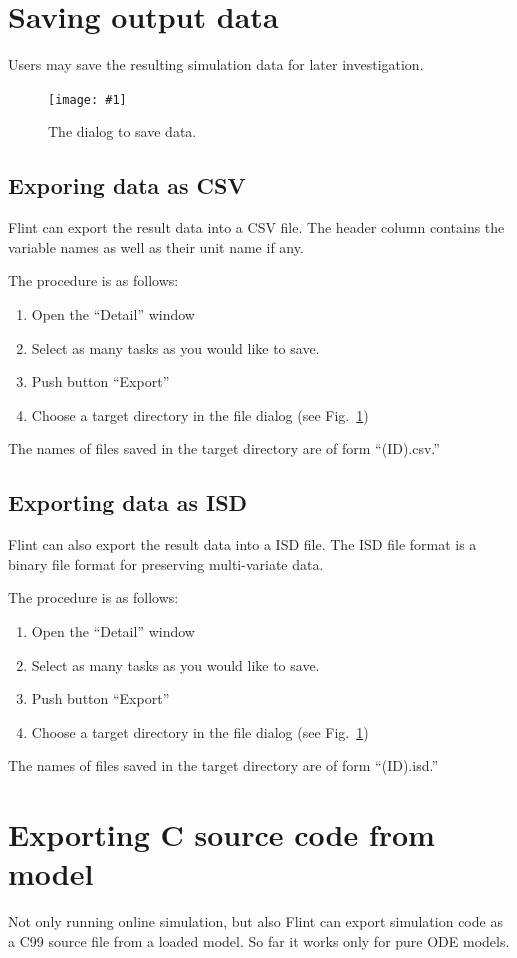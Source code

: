 \documentclass[a4paper,10pt]{report}
\newcommand\FigureOfImage[2]{\begin{figure}[h]
  \centering
  \texttt{[image: \#1]}
  \caption{#2}\label{fig:#1}
\end{figure}}
\begin{document}
\section{Saving output data}
Users may save the resulting simulation data for later investigation.
\FigureOfImage{lr-export}{The dialog to save data.}

\subsection{Exporing data as CSV}
Flint can export the result data into a CSV file.
The header column contains the variable names as well as their unit name if any.

The procedure is as follows:
\begin{enumerate}
\item Open the ``Detail'' window
\item Select as many tasks as you would like to save.
\item Push button ``Export''
\item Choose a target directory in the file dialog (see Fig.~\ref{fig:lr-export})
\end{enumerate}
The names of files saved in the target directory are of form ``(ID).csv.''

\subsection{Exporting data as ISD}
Flint can also export the result data into a ISD file.
The ISD file format is a binary file format for preserving multi-variate data.

The procedure is as follows:
\begin{enumerate}
\item Open the ``Detail'' window
\item Select as many tasks as you would like to save.
\item Push button ``Export''
\item Choose a target directory in the file dialog (see Fig.~\ref{fig:lr-export})
\end{enumerate}
The names of files saved in the target directory are of form ``(ID).isd.''

\section{Exporting C source code from model}
Not only running online simulation, but also Flint can export simulation code
as a C99 source file from a loaded model. So far it works only for pure ODE models.
\end{document}
